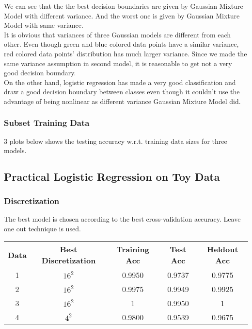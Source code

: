 \documentclass[letter,11pt]{article}
\begin{document}
		 We can see that the the best decision boundaries are given by Gaussian Mixture Model with different variance. And the worst one is given by Gaussian Mixture Model with same variance.\\
		 
		 
		 It is obvious that variances of three Gaussian models are different from each other. Even though green and blue colored data points have a similar variance, red colored data points' distribution has much larger variance. Since we made the same variance assumption in second model, it is reasonable to get not a very good decision boundary.\\
		 
		 On the other hand, logistic regression has made a very good classification and draw a good decision boundary between classes even though it couldn't use the advantage of being nonlinear as different variance Gaussian Mixture Model did.
		 
		 
		 
	 \subsubsection{Subset Training Data}
	 3 plots below shows the testing accuracy w.r.t. training data sizes for three models.


	\subsection{Practical Logistic Regression on Toy Data}
	\subsubsection{Discretization}
	The best model is chosen according to the best cross-validation accuracy. Leave one out technique is used.
		\begin{center}
			\begin{tabular}{|c| c |c |c | c |} 
				\hline
				Data & Best Discretization & Training Acc & Test Acc & Heldout Acc\\ [0.5ex] 
				\hline
				1 & $16^2$ & 0.9950 & 0.9737 & 0.9775 \\ 
				\hline
				2 & $16^2$ & 0.9975 & 0.9949 & 0.9925 \\
				\hline
				3 & $16^2$ & 1 & 0.9950 & 1 \\
				\hline
				4 & $4^2$ & 0.9800 & 0.9539 & 0.9675\\
				\hline
			\end{tabular}
		\end{center}	 
\end{document}
